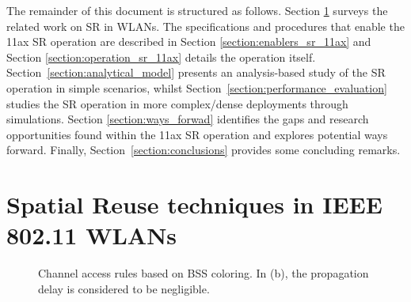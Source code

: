 \documentclass[comsoc]{IEEEtran}
\begin{document}
	The remainder of this document is structured as follows. Section \ref{section:previous_work_sr} surveys the related work on SR in WLANs. The specifications and procedures that enable the 11ax SR operation are described in Section \ref{section:enablers_sr_11ax} and Section \ref{section:operation_sr_11ax} details the operation itself. Section~\ref{section:analytical_model} presents an analysis-based study of the SR operation in simple scenarios, whilst Section~\ref{section:performance_evaluation} studies the SR operation in more complex/dense deployments through simulations. Section \ref{section:ways_forwad} identifies the gaps and research opportunities found within the 11ax SR operation and explores potential ways forward. Finally, Section~\ref{section:conclusions} provides some concluding remarks.
	
	\section{Spatial Reuse techniques in IEEE 802.11 WLANs}%
	\label{section:previous_work_sr}
	
	\begin{figure}[ht!]
		\centering
		\hspace{1cm}
		\caption{Channel access rules based on BSS coloring. In (b), the propagation delay is considered to be negligible.}
	\end{figure}
	
\end{document}
